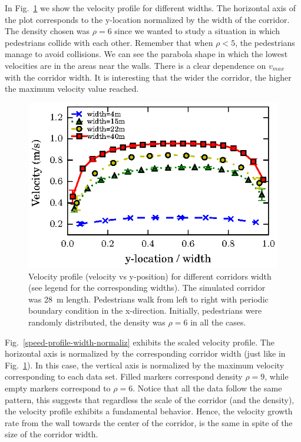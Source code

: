 In Fig.~\ref{speed-profile-multi_width} we show the velocity profile for different widths. The horizontal axis of the plot corresponds to the y-location normalized by the width of the corridor. The density chosen was $\rho = 6$ since we wanted to study a situation in which pedestrians collide with each other. Remember that when $\rho<5$, the pedestrians manage to avoid collisions. We can see the parabola shape in which the lowest velocities are in the areas near the walls. There is a clear dependence on $v_{max}$ with the corridor width. It is interesting that the wider the corridor, the higher the maximum velocity value reached.\\


\begin{figure}[htbp!]
\includegraphics[width=\columnwidth]
{plots/v(y)_multi_width.eps}
\caption{\label{speed-profile-multi_width} Velocity profile (velocity vs y-position) for different corridors width (see legend for the corresponding widths). The simulated corridor was 28~m length. Pedestrians walk from left to right with periodic boundary condition in the x-direction. Initially, pedestrians were randomly distributed, the density was $\rho = 6$ in all the cases. }
\end{figure}


Fig.~\ref{speed-profile-width-normaliz} exhibits the scaled velocity profile. The horizontal axis is normalized by the corresponding corridor width (just like in Fig.~\ref{speed-profile-multi_width}). In this case, the vertical axis is normalized by the maximum velocity corresponding to each data set. Filled markers correspond density $\rho=9$, while empty markers correspond to $\rho=6$. Notice that all the data follow the same  pattern, this suggests that regardless the scale of the corridor (and the density), the velocity profile exhibits a fundamental behavior. Hence, the velocity growth rate from the wall towards the center of the corridor, is the same in spite of the size of the corridor width. 

